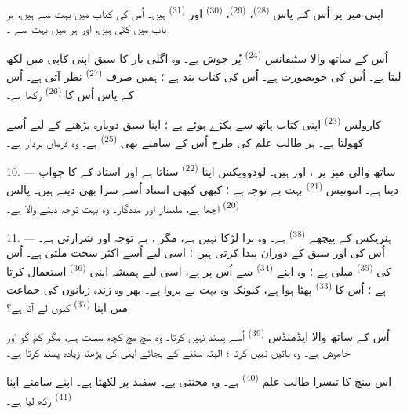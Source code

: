 اپنی میز پر اُس کے پاس  \textsuperscript{(28)}،
 \textsuperscript{(29)}،  \textsuperscript{(30)}
اور  \textsuperscript{(31)} ہیں۔ اُس کی کتاب میں بہت سے
 ہیں، ہر باب میں کئی  ہیں، اور ہر
 میں بہت سے ۔

اُس کے ساتھ والا سٹیفانس \textsuperscript{(24)} پُر جوش ہے۔ وہ اگلی
بار کا سبق اپنی کاپی میں لکھ لیتا ہے۔ اُس کی  خوبصورت
ہے۔ اُس کی کتاب بند ہے ؛ ہمیں صرف  \textsuperscript{(27)}
نظر آتی ہے۔ اُس کے پاس اُس کا  \textsuperscript{(26)}
رکھا ہے۔

کارولس \textsuperscript{(23)} اپنی کتاب ہاتھ سے پکڑے ہوئے ہے ؛ اپنا
سبق دوبارہ پڑھنے کے لیے اُسے کھولتا ہے۔ ہر طالب علم کی طرح اُس کے
سامنے بھی  \textsuperscript{(25)} ہے۔ وہ فرماں بردار ہے۔

10. --- ساتھ والی میز پر ،  اور
 ہیں۔ لودوویکس اپنا  \textsuperscript{(22)}
سناتا ہے اور استاد کے  کا جواب دیتا ہے۔ انتونیس
\textsuperscript{(21)} بہت بے توجہ ہے ؛ کبھی کبھی استاد اُسے سزا بھی
دیتے ہیں۔ پالس \textsuperscript{(20)} اچھا  ہے، ملنسار
اور مددگار۔ وہ بہت توجہ دینے والا ہے۔

\VUsaut{4.2mm}
\VUsaut{3.2mm}

11. --- ہنریکس کے پیچھے  \textsuperscript{(38)} ہے۔ وہ
برا لڑکا نہیں ہے، مگر ، بے توجہ اور شرارتی ہے۔ اُس کی
 اور  سبق کے دوران 
پیدا کرتی ہیں ؛ اسی لیے اُسے اکثر سخت  ملتی ہے۔ اُس کی
 \textsuperscript{(35)} میلی ہے ؛ وہ اپنے
 \textsuperscript{(34)} سے اُس پر  ہے،
اسی لیے ہمیشہ اپنی  \textsuperscript{(36)} استعمال کرتا
ہے ؛ اُس کا  \textsuperscript{(33)} پھٹا ہوا
ہے، کیونکہ وہ بہت بے پروا ہے۔ پھر وہ زندہ زبانوں کی جماعت میں اپنا
 \textsuperscript{(37)} کیوں لے آتا ہے؟

اُس کے ساتھ والا ایڈمنڈس \textsuperscript{(39)} اُسے پسند نہیں کرتا۔ وہ
سچ مچ کچھ سست ہے، مگر کم گو اور خاموش ہے۔ وہ باتیں نہیں کرتا ؛ البتہ
سننے کے بجائے اپنی  کی  پڑھنا
زیادہ پسند کرتا ہے۔

اس بینچ کا تیسرا طالب علم  \textsuperscript{(40)} ہے۔
وہ محنتی ہے۔ سفید  پر لکھتا ہے۔ اپنے سامنے اپنا
 \textsuperscript{(41)} رکھ لیا ہے۔


